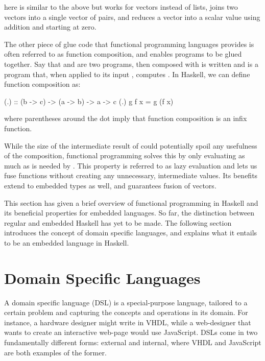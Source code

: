 \documentclass[../paper.tex]{subfiles}
\begin{document}

\noindent {} here is similar to the above  but works for vectors instead of lists,  joins two vectors into a single vector of pairs, and  reduces a vector into a scalar value using addition and starting at zero.

The other piece of glue code that functional programming languages provides is often referred to as function composition, and enables programs to be glued together. Say that  and  are two programs, then  composed with  is written  and is a program that, when applied to its input , computes . In Haskell, we can define function composition as:

\begin{code}
(.) :: (b -> c) -> (a -> b) -> a -> c
(.) g f x = g (f x)
\end{code}

\noindent where parentheses around the dot imply that function composition is an infix function.

While the size of the intermediate result of  could potentially spoil any usefulness of the composition, functional programming solves this by only evaluating  as much as is needed by . This property is referred to as lazy evaluation and lets us fuse functions without creating any unnecessary, intermediate values. Its benefits extend to embedded types as well, and guarantees fusion of vectors.

This section has given a brief overview of functional programming in Haskell and its beneficial properties for embedded languages. So far, the distinction between regular and embedded Haskell has yet to be made. The following section introduces the concept of domain specific languages, and explains what it entails to be an embedded language in Haskell. 

\section{Domain Specific Languages}
\label{domain}

A domain specific language (DSL) is a special-purpose language, tailored to a certain problem and capturing the concepts and operations in its domain. For instance, a hardware designer might write in VHDL, while a web-designer that wants to create an interactive web-page would use JavaScript. DSLs come in two fundamentally different forms: external and internal, where VHDL and JavaScript are both examples of the former.
\end{document}
